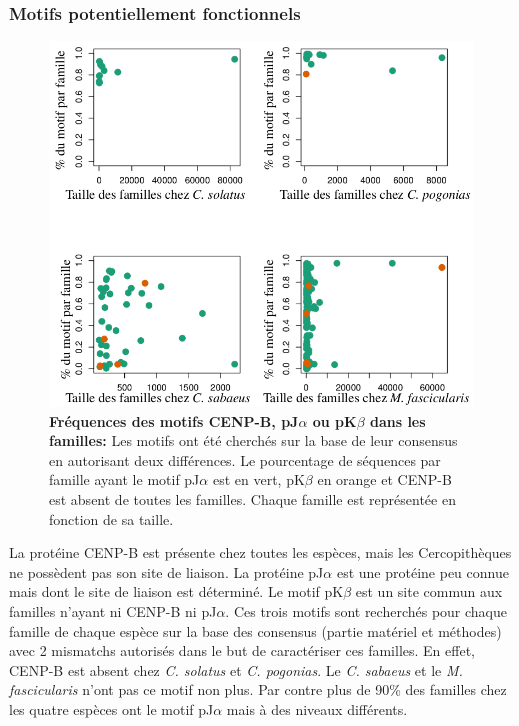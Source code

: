 \documentclass[12pt,a4paper]{article}
\begin{document}
			\subsubsection{Motifs potentiellement fonctionnels}
\begin{figure}
	\center	
	\includegraphics[scale=0.4]{img/graphique_motifs.png}
	\caption{\textbf{Fréquences des motifs CENP-B, pJ$\alpha$ ou pK$\beta$ dans les familles:} Les motifs ont été cherchés sur la base de leur consensus en autorisant deux différences. Le pourcentage de séquences par famille ayant le motif pJ$\alpha$ est en vert, pK$\beta$ en orange et CENP-B est absent de toutes les familles. Chaque famille est représentée en fonction de sa taille.
	\label{fig:motif}} 
\end{figure}
			
			La protéine CENP-B est présente chez toutes les espèces, mais les Cercopithèques ne possèdent pas son site de liaison. La protéine pJ$\alpha$ est une protéine peu connue mais dont le site de liaison est déterminé. Le motif pK$\beta$ est un site commun aux familles n'ayant ni CENP-B ni pJ$\alpha$. Ces trois motifs sont recherchés pour chaque famille de chaque espèce sur la base des consensus (partie matériel et méthodes) avec 2 mismatchs autorisés dans le but de caractériser ces familles. En effet, CENP-B est absent chez \textit{C. solatus} et \textit{C. pogonias}. Le \textit{C. sabaeus} et le \textit{M. fascicularis} n'ont pas ce motif non plus. Par contre plus de 90\% des familles chez les quatre espèces ont le motif pJ$\alpha$ mais à des niveaux différents.
			
\end{document}
